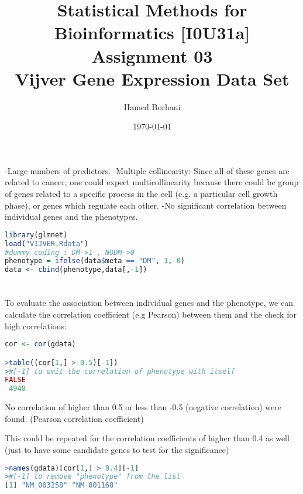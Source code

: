 \documentclass[11pt]{article}
\title{\textbf{Statistical Methods for Bioinformatics [I0U31a] \\Assignment 03 
\\Vijver Gene Expression Data Set}}
\author{Hamed Borhani}
\date{\today}
\begin{document}
\maketitle

\newpage

\section{}
-Large numbers of predictors. 
-Multiple collinearity: Since all of these genes are related to cancer, one could expect multicollinearity because there could be group of genes related to a specific process in the cell (e.g. a particular cell growth phase), or genes which regulate each other.
-No significant correlation between individual genes and the phenotypes.

\begin{lstlisting}[language=R, breaklines=true, basicstyle=\ttfamily]
library(glmnet)
load("VIJVER.Rdata")
#dummy coding : DM->1 , NODM->0
phenotype = ifelse(data$meta == "DM", 1, 0)
data <- cbind(phenotype,data[,-1])
\end{lstlisting}

\section{}
To evaluate the association between individual genes and the phenotype, we can calculate the correlation coefficient (e.g Pearson) between them and the check for high correlations:
\begin{lstlisting}[language=R, breaklines=true, basicstyle=\ttfamily]
cor <- cor(gdata)

>table((cor[1,] > 0.5)[-1])		
>#[-1] to omit the correlation of phenotype with itself
FALSE
 4948
\end{lstlisting}
No correlation of higher than 0.5 or less than -0.5 (negative correlation) were found. (Pearson correlation coefficient)

This could be repeated for the correlation coefficients of higher than 0.4 as well (just to have some candidate genes to test for the significance)
\begin{lstlisting}[language=R, breaklines=true, basicstyle=\ttfamily]
>names(gdata)[cor[1,] > 0.4][-1]	
>#[-1] to remove "phenotype" from the list
[1] "NM_003258" "NM_001168"
\end{lstlisting}
\end{document}

